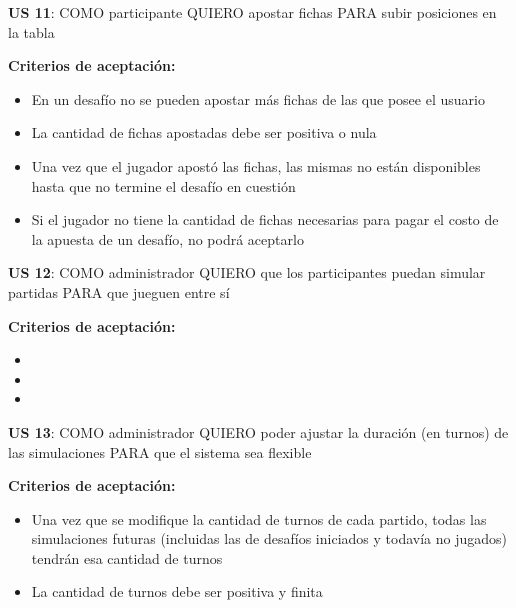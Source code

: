 \begin{tcolorbox}
\textbf{US 11}: COMO participante QUIERO apostar fichas PARA subir posiciones en la tabla

\vline

\textbf{Criterios de aceptación:}
\begin{itemize}
\item En un desafío no se pueden apostar más fichas de las que posee el usuario
\item La cantidad de fichas apostadas debe ser positiva o nula
\item Una vez que el jugador apostó las fichas, las mismas no están disponibles hasta que no termine el desafío en cuestión
\item Si el jugador no tiene la cantidad de fichas necesarias para pagar el costo de la apuesta de un desafío, no podrá aceptarlo
\end{itemize}
\end{tcolorbox}
\vspace{10pt}


\begin{tcolorbox}
\textbf{US 12}: COMO administrador QUIERO que los participantes puedan simular partidas PARA que jueguen entre sí

\vline

\textbf{Criterios de aceptación:}
\begin{itemize}
\item %
\item %
\item %
\end{itemize}
\end{tcolorbox}
\vspace{10pt}


\begin{tcolorbox}
\textbf{US 13}: COMO administrador QUIERO poder ajustar la duración (en turnos) de las simulaciones PARA que el sistema sea flexible

\vline

\textbf{Criterios de aceptación:}
\begin{itemize}
\item Una vez que se modifique la cantidad de turnos de cada partido, todas las simulaciones futuras (incluidas las de desafíos iniciados y todavía no jugados) tendrán esa cantidad de turnos
\item La cantidad de turnos debe ser positiva y finita
\end{itemize}
\end{tcolorbox}
\vspace{10pt}

